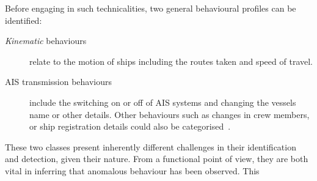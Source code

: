 \iffalse
The current research will maintain a similar structure throughout, dividing each chapter into two
parts; each addressing their assigned research question. Following the Introduction, Chapter 2 will
present the Literature Review, which will discuss and relate previous studies to the current research.
Chapter 3 presents the Method, which addresses the necessary methodology required per part. Part 1
can be considered an exploratory analysis of Bejarano’s (2016) work and of the data itself, whereas
part 2 briefly explains the new target feature and subset required to detect fishing gear types.
Naturally, the experiments will be explained in this chapter prior to conducting them. Chapter 4
presents the results obtained per experiment. Chapter 5 presents the Discussion, where the
classification results will be analysed in further detail along with the contributions, limitations, and recommendations for future research.

The remainder of this work is organised as follows: Section 2 reviews the background
and related work regarding the open data, AD and data fusion in the MS domain. Section 3
presents the research methodology. Validity threats and verification are described in sections
4 and 5, respectively. Section 6 presents the experiment results and the validation results are
shown in section 7. Section 8 features a detailed discussion about the obtained results.
Finally, section 9 concludes the research with a discussion on the possible directions for
future work.
\fi

\iffalse
Before engaging in such technicalities, two general behavioural profiles can be identified:
\begin{description}
\item[\emph{Kinematic} behaviours] relate to the motion of ships including the routes taken and speed of travel.
\item [AIS transmission behaviours] include the switching on or off of AIS systems and changing the vessels name or other details. Other behaviours such as changes in crew members, or ship registration details could also be categorised~\cite{Lane2010}.
\end{description}


These two classes present inherently different challenges in their identification and detection, given their nature. From a functional point of view, they are both vital in inferring that anomalous behaviour has been observed. This 

